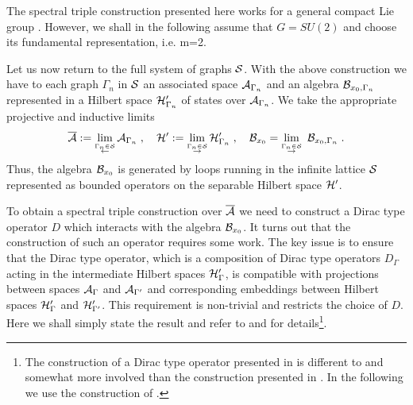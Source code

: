 \documentclass[12pt]{article}
\def\G{\Gamma}
\def\ca{{\cal A}}
\def\cb{{\cal B}}
\def\ch{{\cal H}}
\def\cs{{\cal S}}
\begin{document}
The spectral triple construction presented here works for a general compact Lie group \cite{Lai:2010ig}. However, we shall in the following assume that $G=SU(2)$ and choose its fundamental representation, i.e. m=2. 



Let us now return to the full system of graphs $\cs$. With the above construction we have to each graph $\G_n$ in $\cs$ an associated space $\ca_{\G_n}$ and an algebra $\cb_{x_0,\G_n}$ represented in a Hilbert space $\ch'_{\G_n}$ of states over $\ca_{\G_n}$. We take the appropriate projective and inductive limits
$$
\overline{\ca}:=\lim_{\stackrel{\G_n\in\cs}{\leftarrow}}\ca_{\G_n}\;,\quad   \ch' := \lim_{\stackrel{\G_n\in\cs}{\rightarrow}}\ch'_{\G_n}\;,\quad
\cb_{x_0}=  \lim_{\stackrel{\G_n\in\cs}{\rightarrow}}\ \cb_{x_0,\G_n}\;.
$$
Thus, the algebra $\cb_{x_0}$ is generated by loops running in the infinite lattice $\cs$ represented as bounded operators on the separable Hilbert space $\ch'$. %

To obtain a spectral triple construction over $\overline{\ca}$ we need to construct a Dirac type operator $D$ which interacts with the algebra $\cb_{x_0}$. It turns out that the construction of such an operator requires some work. The key issue is to ensure that the Dirac type operator, which is a composition of Dirac type operators $D_\G$ acting in the intermediate Hilbert spaces $\ch'_\G$, is compatible with projections between spaces $\ca_\G$ and $\ca_{\G'}$ and corresponding embeddings between Hilbert spaces $\ch'_\G$ and $\ch'_{\G'}$. This requirement is non-trivial and restricts the choice of $D$. Here we shall simply state the result and refer to \cite{AGN2} and \cite{AGN3} for details\footnote{The construction of a Dirac type operator presented in \cite{AGN2} is different to and somewhat more involved than the construction presented in \cite{AGN3}. In the following we use the construction of  \cite{AGN3}.}.
\end{document}
